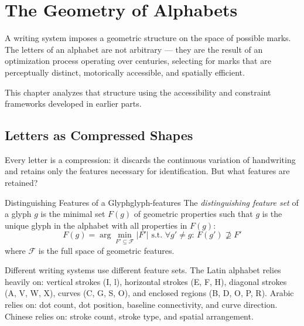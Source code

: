 \chapter{The Geometry of Alphabets}



A writing system imposes a geometric structure on the space of possible
marks. The letters of an alphabet are not arbitrary — they are the result
of an optimization process operating over centuries, selecting for marks
that are perceptually distinct, motorically accessible, and spatially
efficient.

This chapter analyzes that structure using the accessibility and
constraint frameworks developed in earlier parts.

\section{Letters as Compressed Shapes}

Every letter is a compression: it discards the continuous variation of
handwriting and retains only the features necessary for identification.
But what features are retained?

\begin{definition}{Distinguishing Features of a Glyph}{glyph-features}
  The \emph{distinguishing feature set} of a glyph $g$ is the minimal
  set $F(g)$ of geometric properties such that $g$ is the unique glyph
  in the alphabet with all properties in $F(g)$:
  \[
    F(g) = \arg\min_{F' \subseteq \mathcal{F}} |F'| \text{ s.t. }
    \forall g' \neq g:\, F(g') \not\supseteq F'
  \]
  where $\mathcal{F}$ is the full space of geometric features.
\end{definition}

Different writing systems use different feature sets. The Latin alphabet
relies heavily on: vertical strokes (I, l), horizontal strokes (E, F, H),
diagonal strokes (A, V, W, X), curves (C, G, S, O), and enclosed regions
(B, D, O, P, R). Arabic relies on: dot count, dot position, baseline
connectivity, and curve direction. Chinese relies on: stroke count,
stroke type, and spatial arrangement.

